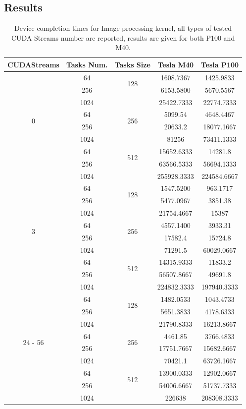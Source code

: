 \subsection{Results}
\begin{table}	
	\centering	
	\vspace*{-1.5cm}
	\begin{tabular}{ | c |  c c  || c | c | } 
		\hline

		CUDAStreams &	Tasks Num. & Tasks Size & Tesla M40 & Tesla P100\\
		\hline\hline
		\multirow{8}{*}{0}&	64&	\multirow{2}{*}{128}&	1608.7367&	1425.9833\\
		&	256& &	6153.5800&	5670.5567\\
		&	1024& & 25422.7333&	22774.7333\\
		&	64&	\multirow{2}{*}{256}&	5099.54 &	4648.4467\\
		&	256&	&	20633.2 &	18077.1667\\
		&	1024&	&	81256 &	73411.1333\\
		&	64&	\multirow{2}{*}{512}&	15652.6333&	14281.8 \\
		&	256& &	63566.5333&	56694.1333\\
		&	1024& &	255928.3333&	224584.6667\\
		\hline
		\multirow{8}{*}{3}&	64&	\multirow{2}{*}{128}&	1547.5200&	963.1717\\
		&	256&	&	5477.0967&	3851.38\\
		&	1024&	&	21754.4667&	15387\\
		&	64&	\multirow{2}{*}{256}&	4557.1400&	3933.31\\
		&	256&	&	17582.4&	15724.8\\
		&	1024&	&	71291.5&	60029.0667\\
		&	64&	\multirow{2}{*}{512}&	14315.9333&	11833.2\\
		&	256&	&	56507.8667&	49691.8\\
		&	1024&	&	224832.3333&	197940.3333\\
		\hline
		\multirow{8}{*}{24 - 56}&	64&	\multirow{2}{*}{128}&	1482.0533&	1043.4733\\
		&	256&	&	5651.3833&	4178.6333\\
		&	1024&	&	21790.8333&	16213.8667\\
		&	64&	\multirow{2}{*}{256}&	4461.85&	3766.4833\\
		&	256&	&	17751.7667&	15682.6667\\
		&	1024&	&	70421.1&	63726.1667\\
		&	64&	\multirow{2}{*}{512}&	13900.0333&	12902.0667\\
		&	256&	&	54006.6667&	51737.7333\\
		&	1024&	&	226638&	208308.3333\\	
		\hline	
	\end{tabular}
	\caption{Device completion times for Image processing kernel, all types of tested CUDA Streams number are reported, results are given for both P100 and M40.}	
	\label{tab:imgavgs}		
\end{table}

